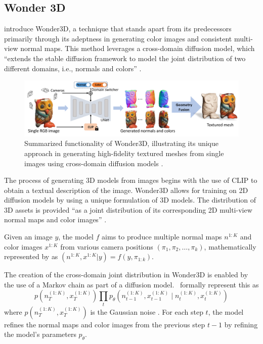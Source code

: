 \subsection{Wonder 3D}\label{Wonder3D}

\citeauthor{long2023wonder3d} introduce Wonder3D, a technique that stands apart from its predecessors primarily through its adeptness in generating color images and consistent multi-view normal maps. This method leverages a cross-domain diffusion model, which ``extends the stable diffusion framework to model the joint distribution of two different domains, i.e., normals and colors'' \citep{long2023wonder3d}.


\begin{figure}[ht]
  \centering
    \includegraphics[width=1\columnwidth]{figures/Wonder3D.png}
    \caption{Summarized functionality of Wonder3D, illustrating its unique approach in generating high-fidelity textured meshes from single images using cross-domain diffusion models \citep{long2023wonder3d}.}\label{fig:Wonder3D}
\end{figure}

The process of generating 3D models from images begins with the use of CLIP \citep{radfordCLIP} to obtain a textual description of the image. Wonder3D allows for training on 2D diffusion models by using a unique formulation of 3D models. The distribution of 3D assets is provided ``as a joint distribution of its corresponding 2D multi-view normal maps and color images'' \citep{long2023wonder3d}. 

Given an image \( y \), the model \(f\) aims to produce multiple normal maps \( n^{1:K} \) and color images \( x^{1:K} \) from various camera positions \((\pi_1, \pi_2, \ldots, \pi_k)\), mathematically represented by \citeauthor{long2023wonder3d} as \((n^{1:K}, x^{1:K} | y) = f(y, \pi_{1:k})\).

The creation of the cross-domain joint distribution in Wonder3D is enabled by the use of a Markov chain as part of a diffusion model.~\citeauthor{long2023wonder3d} formally represent this as \[ p\left(n_T^{(1: K)}, x_T^{(1: K)}\right) \prod_t p_\theta\left(n_{t-1}^{(1: K)}, x_{t-1}^{(1: K)} \mid n_t^{(1: K)}, x_t^{(1: K)}\right) \] where \( p\left(n_T^{(1: K)}, x_T^{(1: K)}\right) \) is the Gaussian noise \citep{long2023wonder3d}. For each step \(t\), the model refines the normal maps and color images from the previous step \(t-1\) by refining the model's parameters \(p_\theta\).

